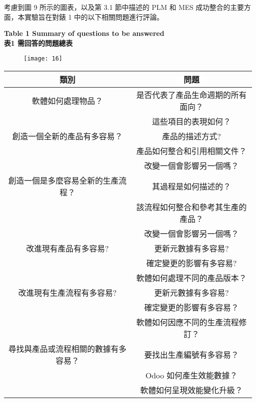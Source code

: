 \fontsize{14pt}{5pt}\sectionef
 {考慮到圖 9 所示的圖表，以及第 3.1 節中描述的 PLM 和 MES 成功整合的主要方面，本實驗旨在對錶 1 中的以下相關問題進行評論。}\\[15pt]

\begin{center}
 \fontsize{16}{16}\selectfont \textbf{Table 1 Summary of questions to be answered}\\
\fontsize{16}{16}\selectfont \textbf{表1 需回答的問題總表}\\
\end{center}

\begin{figure}[hbt!]
\begin{center}
\texttt{[image: 16]}
\end{center}
\end{figure}

\newpage



\begin{table}[htbp]
    \centering
    \label{tab:example}
    \begin{tabular}{|c|c|}
        \hline
        類別 & 問題 \\
        \hline
        軟體如何處理物品？ & 是否代表了產品生命週期的所有面向？ \\
         & 這些項目的表現如何？\\
         \hline
        創造一個全新的產品有多容易？ & 產品的描述方式? \\
         & 產品如何整合和引用相關文件？\\
         & 改變一個會影響另一個嗎？ \\
         \hline
       創造一個是多麼容易全新的生產流程？ & 其過程是如何描述的？ \\
         & 該流程如何整合和參考其生產的產品？\\
         & 改變一個會影響另一個嗎？ \\
         \hline
        改進現有產品有多容易? & 更新元數據有多容易? \\
         & 確定變更的影響有多容易? \\
         & 軟體如何處理不同的產品版本？ \\
        \hline
        改進現有生產流程有多容易? & 更新元數據有多容易? \\
         & 確定變更的影響有多容易？\\
         & 軟體如何因應不同的生產流程修訂？\？ \\
        \hline
        尋找與產品或流程相關的數據有多容易？ & 要找出生產編號有多容易？ \\
         & Odoo 如何產生效能數據？ \\
         & 軟體如何呈現效能變化升級？ \\
        \hline
    \end{tabular}
\end{table}



